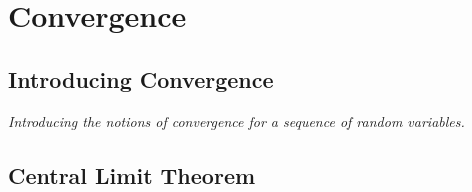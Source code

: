 
\chapter{Convergence}



\section{Introducing Convergence}

\textit{Introducing the notions of convergence for a sequence of random variables.}




\section{Central Limit Theorem}